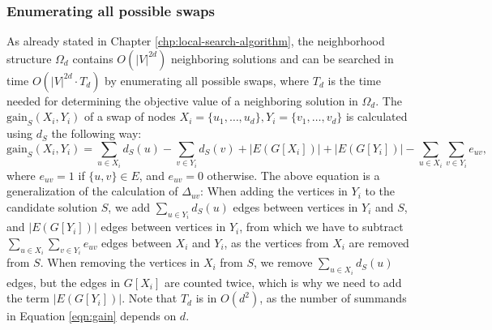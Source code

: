 \documentclass[draft,final]{vutinfth} %
\begin{document}
\subsubsection{Enumerating all possible swaps}
As already stated in Chapter \ref{chp:local-search-algorithm}, the neighborhood structure $\Omega_d$ contains $O(|V|^{2d})$ neighboring solutions and can be searched in time $O(|V|^{2d} \cdot T_d)$ by enumerating all possible swaps, where $T_d$ is the time needed for determining the objective value of a neighboring solution in $\Omega_d$. 
The $\mathrm{gain}_S(X_i, Y_i)$ of a swap of nodes $X_i = \{u_1, \dots, u_d\}, Y_i = \{v_1, \dots, v_d\}$ is calculated using $d_S$ the following way: 
\begin{equation}\label{eqn:gain}
    \mathrm{gain}_S(X_i, Y_i) = \sum_{u \in X_i} d_S(u) - \sum_{v \in Y_i} d_S(v) + |E(G[X_i])| + |E(G[Y_i])| - \sum_{u \in X_i} \sum_{v \in Y_i} e_{uv},
\end{equation}
where $e_{uv} = 1$ if $\{u,v\} \in E$, and $e_{uv} = 0$ otherwise. 
The above equation is a generalization of the calculation of $\Delta_{uv}$: When adding the vertices in $Y_i$ to the candidate solution $S$, we add $\sum_{u \in Y_i} d_S(u)$ edges between vertices in $Y_i$ and $S$, and $|E(G[Y_i])|$ edges between vertices in $Y_i$, from which we have to subtract $\sum_{u \in X_i} \sum_{v \in Y_i} e_{uv}$ edges between $X_i$ and $Y_i$, as the vertices from $X_i$ are removed from $S$. When removing the vertices in $X_i$ from $S$, we remove $\sum_{u \in X_i} d_S(u)$ edges, but the edges in $G[X_i]$ are counted twice, which is why we need to add the term $|E(G[Y_i])|$. Note that $T_d$ is in $O(d^2)$, as the number of summands in Equation \ref{eqn:gain} depends on $d$. 
\end{document}
